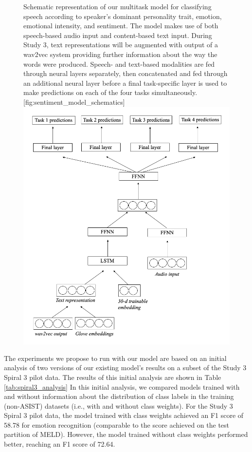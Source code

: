 \begin{figure}
    \begin{sidecaption}{%
        Schematic representation of our multitask model
    for classifying speech according to speaker's dominant personality trait,
    emotion, emotional intensity, and sentiment. The model makes use of both
    speech-based audio input and content-based text input. During Study 3,
    text representations will be augmented with output of a wav2vec system
    providing further information about the way the words were produced.
    Speech- and text-based modalities are fed through neural layers separately,
    then concatenated and fed through an additional neural layer before a final
    task-specific layer is used to make predictions on each of the four tasks
    simultaneously. }[fig:sentiment_model_schematics]
    \includegraphics[width=\textwidth]{images/sentiment_schematics_study3.png}
    \end{sidecaption}
\end{figure}

The experiments we propose to run with our model are based on an initial
analysis of two versions of our existing model's results on a subset of the
Study 3 Spiral 3 pilot data. The results of this initial analysis are shown in
Table \ref{tab:spiral3_analysis} In this initial analysis, we compared models
trained with and without information about the distribution of class labels in
the training (non-ASIST) datasets (i.e., with and without class weights).  For
the Study 3 Spiral 3 pilot data, the model trained with class weights achieved
an F1 score of 58.78 for emotion recognition (comparable to the score achieved
on the test partition of MELD). However, the model trained without class
weights performed better, reaching an F1 score of 72.64.

